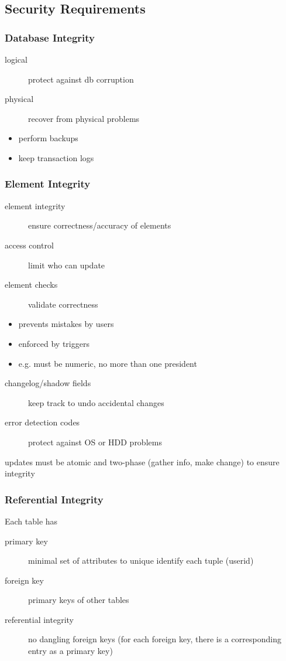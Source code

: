 \documentclass[]{article}
\theoremstyle{definition}
\begin{document}
	\subsection{Security Requirements}
	\subsubsection{Database Integrity}
	\begin{description}
		\item[logical] protect against db corruption
		\item[physical] recover from physical problems
	\end{description}
	\begin{itemize}
		\item perform backups
		\item keep transaction logs
	\end{itemize}

	\subsubsection{Element Integrity}
	\begin{description}
		\item[element integrity] ensure correctness/accuracy of elements
		\item[access control] limit who can update
		\item[element checks] validate correctness
	\end{description}
	\begin{itemize}
		\item prevents mistakes by users
		\item enforced by triggers
		\item e.g. must be numeric, no more than one president
	\end{itemize}
	\begin{description}
		\item[changelog/shadow fields] keep track to undo accidental changes
		\item[error detection codes] protect against OS or HDD problems
	\end{description}

	updates must be atomic and two-phase (gather info, make change) to ensure integrity

	\subsubsection{Referential Integrity}
	Each table has
	\begin{description}
		\item[primary key] minimal set of attributes to unique identify each tuple (userid)
		\item[foreign key] primary keys of other tables
		\item[referential integrity] no dangling foreign keys (for each foreign key, there is a corresponding entry as a primary key)
	\end{description}
\end{document}
